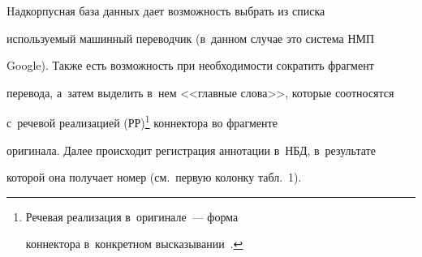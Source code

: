   Hадкорпусная база данных дает возможность выбрать из списка 


используемый машинный переводчик (в~данном случае это система НМП 


Google). Также есть возможность при необходимости сократить фрагмент 


перевода, а~затем выделить в~нем <<главные слова>>, которые соотносятся 


с~речевой реализацией (РР)\footnote[1]{Речевая реализация в~оригинале~--- форма 


коннектора в~конкретном высказывании~\cite{19-eg}.} коннектора во фрагменте 


оригинала. Далее происходит регистрация аннотации в~НБД, в~результате 


которой она получает номер (см.\ первую колонку табл.~1).


  


